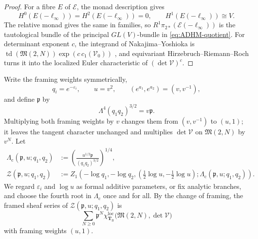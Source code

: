 \documentclass{amsart}
\theoremstyle{definition}
\numberwithin{equation}{section}
\newcommand{\cV}{\mathcal V}
\newcommand{\M}{\mathfrak M}
\newcommand{\eps}{\varepsilon}
\begin{document}
\begin{proof}
For a fibre \(E\) of \(\mathcal E\), the monad description gives
\[
 H^0(E(-\ell_\infty))=H^2(E(-\ell_\infty))=0,
 \qquad H^1(E(-\ell_\infty))\cong V.
\]
The relative monad gives the same in families, so \(R^1\pi_{2*}(\mathcal E(-\ell_\infty))\) is the tautological bundle of the principal \(GL(V)\)-bundle in \eqref{eq:ADHM-quotient}.  For determinant exponent \(c\), the integrand of Nakajima--Yoshioka is \(\operatorname{td}(\M(2,N))\exp(c\,c_1(\mathcal V_0))\) \cite{NakajimaYoshiokaPerverse}, and equivariant Hirzebruch--Riemann--Roch turns it into the localized Euler characteristic of \((\det\cV)^c\).
\end{proof}

Write the framing weights symmetrically,
\[
 q_i=e^{-\eps_i},\qquad u=v^2,\qquad
 (e^{a_1},e^{a_2})=(v,v^{-1}),
\]
and define \(\mathfrak p\) by
\begin{equation}
 \Lambda^4(q_1q_2)^{3/2}=v\mathfrak p.
\label{eq:NY-p-variable}
\end{equation}
Multiplying both framing weights by \(v\) changes them from \((v,v^{-1})\) to \((u,1)\); it leaves the tangent character unchanged and multiplies \(\det\cV\) on \(\M(2,N)\) by \(v^N\).  Let
\begin{equation}
\begin{aligned}
 \Lambda_{\mathrm c}(\mathfrak p,u;q_1,q_2)
 &:={}
 \left(\frac{u^{1/2}\mathfrak p}{(q_1q_2)^{3/2}}\right)^{1/4},\\
 \mathscr Z(\mathfrak p,u;q_1,q_2)
 &:={}
 Z_1\left(
 -\log q_1,-\log q_2,
 \left(\tfrac12\log u,-\tfrac12\log u\right);
 \Lambda_{\mathrm c}(\mathfrak p,u;q_1,q_2)
 \right).
\end{aligned}
\label{eq:NY-mathscrZ-definition}
\end{equation}
We regard \(\eps_i\) and \(\log u\) as formal additive parameters, or fix analytic branches, and choose the fourth root in \(\Lambda_{\mathrm c}\) once and for all.  By the change of framing, the framed sheaf series of \(\mathscr Z(\mathfrak p,u;q_1,q_2)\) is
\begin{equation}
 \sum_{N\geq0}\mathfrak p^N
 \chi_{\mathbf T_{\mathrm{fr}}}^{\mathrm{loc}}\bigl(\M(2,N),\det\cV\bigr)
\label{eq:NY-centered-ADHM}
\end{equation}
with framing weights \((u,1)\).
\end{document}
